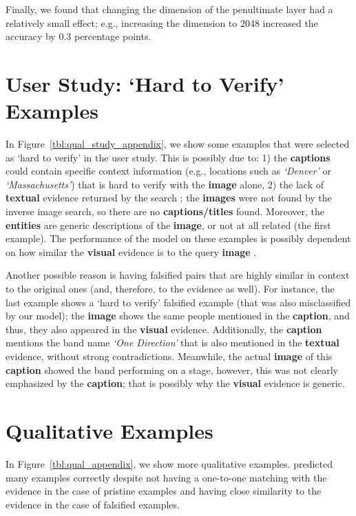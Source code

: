 Finally, we found that changing the dimension of the penultimate layer had a relatively small effect; e.g., increasing the dimension to 2048 increased the accuracy by 0.3 percentage points.

\section{User Study: `Hard to Verify' Examples} \label{sec:user_study_ex}
In Figure~\ref{tbl:qual_study_appendix}, we show some examples that were selected as `hard to verify' in the user study. This is possibly due to: 1) the \textbf{\textcolor{myblue}{captions}} could contain specific context information (e.g., locations such as \textit{`Denver'} or \textit{`Massachusetts'}) that is hard to verify with the \textbf{\textcolor{myOrange}{image}} alone, 2) the lack of \textbf{\textcolor{myblue}{textual}} evidence returned by the search ; the \textbf{\textcolor{myOrange}{images}} were not found by the inverse image search, so there are no \textbf{\textcolor{myblue}{captions/titles}} found. Moreover, the \textbf{\textcolor{myblue}{entities}} are generic descriptions of the \textbf{\textcolor{myOrange}{image}}, or not at all related (the first example). The performance of the model on these examples is possibly dependent on how similar the \textbf{\textcolor{myOrange}{visual}} evidence is to the query \textbf{\textcolor{myOrange}{image}} . 

Another possible reason is having falsified pairs that are highly similar in context to the original ones (and, therefore, to the evidence as well). For instance, the last example shows a `hard to verify' falsified example (that was also misclassified by our model); the \textbf{\textcolor{myOrange}{image}} shows the same people mentioned in the \textbf{\textcolor{myblue}{caption}}, and thus, they also appeared in the \textbf{\textcolor{myOrange}{visual}} evidence. Additionally, the \textbf{\textcolor{myblue}{caption}} mentions the band name \textit{`One Direction'} that is also mentioned in the \textbf{\textcolor{myblue}{textual}} evidence, without strong contradictions. Meanwhile, the actual \textbf{\textcolor{myOrange}{image}} of this \textbf{\textcolor{myblue}{caption}} showed the band performing on a stage, however, this was not clearly emphasized by the \textbf{\textcolor{myblue}{caption}}; that is possibly why the \textbf{\textcolor{myOrange}{visual}} evidence is generic.

\section{Qualitative Examples} \label{sec:qual_analysis2}
In Figure~\ref{tbl:qual_appendix}, we show more qualitative examples. \model{} predicted many examples correctly despite not having a one-to-one matching with the evidence in the case of pristine examples and having close similarity to the evidence in the case of falsified examples. 

